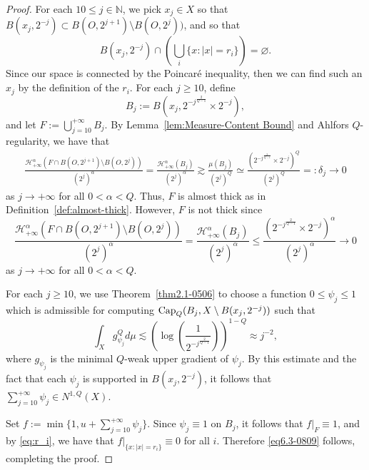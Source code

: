 \documentclass[10pt]{amsart}
\numberwithin{equation}{section}
\newcommand{\Ha}{\mathcal{H}}
\begin{document}
\begin{proof}
 For each $10\leq j\in\mathbb N$, we pick $x_j\in X$ so that $B(x_j,2^{-j})\subset B(O,2^{j+1})\setminus B(O,2^j))$, and so that 
 \begin{equation}\label{eq:r_i}B(x_j, 2^{-j})\cap\left(\bigcup_i\{x:|x|=r_i\}\right)=\varnothing.
 \end{equation}
  Since our space is connected by the Poincar\'e inequality,  then we  can find such an $x_j$   by the definition of the $r_i$.  For each $j\ge 10$, define 
 $$B_j:=B(x_j,2^{-j^{\frac{2}{Q-1}}}\times 2^{-j}),$$
 and let $F:=\bigcup_{j=10}^{+\infty}B_j$. By Lemma~\ref{lem:Measure-Content Bound} and Ahlfors $Q$-regularity, we have that  
\begin{align*}
\frac{\mathcal H^{\alpha}_{+\infty}(F\cap B(O,2^{j+1})\setminus B(O,2^j))}{(2^j)^\alpha}=\frac{\Ha^{\alpha}_{+\infty}(B_j)}{(2^j)^\alpha}\gtrsim\frac{\mu(B_j)}{(2^j)^Q}\simeq\frac{(2^{-j^{\frac{2}{Q-1}}}\times2^{-j})^Q}{(2^j)^Q}=:\delta_j\to 0
\end{align*}
as $j\to+\infty$ for all $0<\alpha<Q$.  Thus, $F$ is almost thick as in Definition~\ref{def:almost-thick}. However, $F$ is not thick since 
\[
\frac{\mathcal H^{\alpha}_{+\infty}(F\cap B(O,2^{j+1})\setminus B(O,2^j))}{(2^j)^\alpha}=\frac{\Ha^{\alpha}_{+\infty}(B_j)}{(2^j)^\alpha}\le \frac{(2^{-j^{\frac{2}{Q-1}}}\times2^{-j})^\alpha}{(2^j)^\alpha}\to 0
\]
as $j\to+\infty$ for all $0<\alpha<Q$.

For each $j\geq 10$, we use Theorem~\ref{thm2.1-0506} to choose a function $0\le\psi_j\le 1$ which is admissible for computing $\text{\rm Cap}_Q(B_j, X\setminus B(x_j,2^{-j}))$ such that $$\int_Xg_{\psi_j}^Qd\mu\lesssim \left( \log \left(\frac{1}{2^{-j^{\frac{2}{Q-1}}}}\right)\right)^{1-Q}\approx j^{-2},$$ where $g_{\psi_j}$ is the minimal $Q$-weak upper gradient of $\psi_j$.  By this estimate and the fact that each $\psi_j$ is supported in $B(x_j,2^{-j})$, it follows that $\sum_{j=10}^{+\infty}\psi_j\in  N^{1,Q}(X)$. 

Set $f:=\min\{1, u+\sum_{j=10}^{+\infty}\psi_j\}$.  Since $\psi_j\equiv 1$ on $B_j$, it follows that $f|_F\equiv 1$, and by \eqref{eq:r_i}, we have that $f|_{\{x:|x|=r_i\}}\equiv 0$ for all $i$.  Therefore \eqref{eq6.3-0809} follows, completing the proof. 
 \end{proof}
\end{document}
